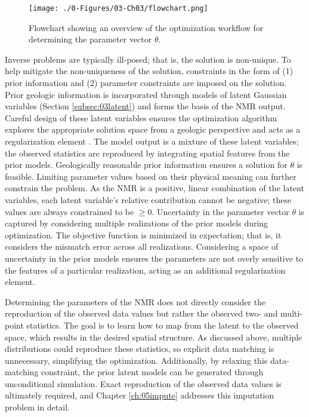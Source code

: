 \begin{figure}[htb!]
    \centering
    \texttt{[image: ./0-Figures/03-Ch03/flowchart.png]}
    \caption{Flowchart showing an overview of the optimization workflow for determining the parameter vector $\theta$.}
    \label{fig:flowchart}
\end{figure}

Inverse problems are typically ill-posed; that is, the solution is non-unique. To help mitigate the non-uniqueness of the solution, constraints in the form of (1) prior information and (2) parameter constraints are imposed on the solution. Prior geologic information is incorporated through models of latent Gaussian variables (Section \ref{subsec:03latent}) and forms the basis of the \gls{NMR} output. Careful design of these latent variables ensures the optimization algorithm explores the appropriate solution space from a geologic perspective and acts as a regularization element \citep{zhou2014inverse}. The model output is a mixture of these latent variables; the observed statistics are reproduced by integrating spatial features from the prior models. Geologically reasonable prior information ensures a solution for $\theta$ is feasible. Limiting parameter values based on their physical meaning can further constrain the problem. As the \gls{NMR} is a positive, linear combination of the latent variables, each latent variable's relative contribution cannot be negative; these values are always constrained to be $\geq 0$. Uncertainty in the parameter vector $\theta$ is captured by considering multiple realizations of the prior models during optimization. The objective function is minimized in expectation; that is, it considers the mismatch error across all realizations. Considering a space of uncertainty in the prior models ensures the parameters are not overly sensitive to the features of a particular realization, acting as an additional regularization element.

Determining the parameters of the \gls{NMR} does not directly consider the reproduction of the observed data values but rather the observed two- and multi-point statistics. The goal is to learn how to map from the latent to the observed space, which results in the desired spatial structure. As discussed above, multiple distributions could reproduce these statistics, so explicit data matching is unnecessary, simplifying the optimization. Additionally, by relaxing this data-matching constraint, the prior latent models can be generated through unconditional simulation. Exact reproduction of the observed data values is ultimately required, and Chapter \ref{ch:05impute} addresses this imputation problem in detail.


